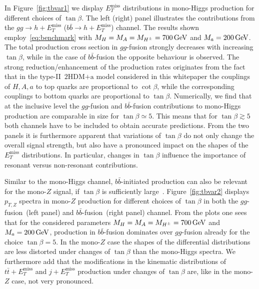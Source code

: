 \documentclass[a4paper, 11pt,notoc]{article}
\newcommand{\MET}{\ensuremath{E_T^\mathrm{miss}}\xspace}
\newcommand{\mA}{\ensuremath{M_{A}}\xspace}
\newcommand{\ma}{\ensuremath{M_{a}}\xspace}
\newcommand{\mH}{\ensuremath{M_{H}}\xspace}
\newcommand{\mHc}{\ensuremath{M_{H^{\pm}}}\xspace}
\newcommand{\hdma}{\ensuremath{\textrm{2HDM+a}}\xspace}
\begin{document}
In Figure~\ref{fig:tbvar1} we display $\MET$ distributions in mono-Higgs production for different choices of $\tan \beta$. The left (right) panel illustrates the contributions from the $gg \to h + \MET$ ($b \bar b \to h + \MET$) channel. The  results shown employ~\eqref{eq:benchmark} with $\mH = \mA = \mHc = 700 \, {\rm GeV}$ and $\ma = 200 \, {\rm GeV}$. The total production cross section in $gg$-fusion strongly decreases with increasing $\tan \beta$, while in the case of $b \bar b$-fusion the opposite behaviour is observed. The strong reduction/enhancement of the production rates originates from the fact that in  the type-II~\hdma model considered in this whitepaper the couplings of $H,A,a$ to top quarks are proportional to $\cot \beta$, while the corresponding couplings to bottom quarks are proportional to $\tan \beta$. Numerically, we find that at the inclusive level the $gg$-fusion and $b\bar b$-fusion contributions to mono-Higgs production are comparable in size for $\tan \beta \simeq 5$. This means that for $\tan \beta \gtrsim 5$ both channels have to be included to obtain accurate predictions. From the two panels it is furthermore apparent that variations of $\tan \beta$ do not only change the overall signal strength, but also have a pronounced impact on the shapes of the $\MET$ distributions. In particular, changes in $\tan \beta$ influence the importance of resonant versus non-resonant contributions. 

 Similar to the mono-Higgs channel, $b \bar b$-initiated production can also be relevant for the mono-$Z$ signal,  if $\tan \beta$ is sufficiently large~\cite{Bauer:2017ota}. Figure~\ref{fig:tbvar2} displays $p_{T,Z}$ spectra in mono-$Z$ production for different choices of $\tan \beta$ in both the $gg$-fusion~(left panel) and $b \bar b$-fusion~(right panel) channel.  From the plots one sees that for the considered parameters $\mH = \mA = \mHc = 700 \, {\rm GeV}$ and $\ma = 200 \, {\rm GeV}$,  production in $b \bar b$-fusion dominates over $gg$-fusion already for the choice $\tan \beta = 5$. In the mono-$Z$ case   the shapes of the differential distributions are less distorted under changes of $\tan \beta$ than the mono-Higgs spectra. We furthermore  add that the modifications in the kinematic distributions of $t \bar t + \MET$ and $j +\MET$ production under changes of $\tan \beta$ are, like in the mono-$Z$ case, not very pronounced.
 
\end{document}
